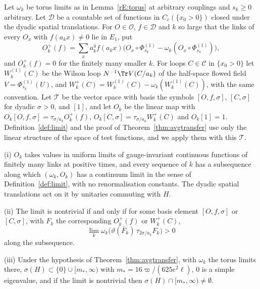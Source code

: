 \begin{theorem}\label{rF13:half}
Let $\omega_k$ be torus limits as in Lemma~\textup{\ref{rE:torus}} at
arbitrary couplings and $s_k\ge0$ arbitrary. Let $\mathcal D$ be a countable
set of functions in $C_c(\{x_0>0\})$ closed under the dyadic spatial
translations. For $O\in\mathcal O$, $f\in\mathcal D$ and $k$ so large that the
links of every $O_x$ with $f(a_kx)\ne0$ lie in $E_1$, put
\[
O^+_k(f)=\sum_xa_k^4f(a_kx)\bigl(O_x\circ\Phi^{(1)}_{s_k}-\omega_k(O_x\circ
\Phi^{(1)}_{s_k})\bigr),
\]
and $O^+_k(f)=0$ for the finitely many smaller $k$. For loops $C\in\mathcal
C$ in $\{x_0>0\}$ let $W^{(1)}_k(C)$ be the Wilson loop $N^{-1}\Tr V(C/a_k)$
of the half-space flowed field $V=\Phi^{(1)}_{s_k}(U)$, and
$W^+_k(C)=W^{(1)}_k(C)-\omega_k(W^{(1)}_k(C))$, with the same convention.
Let $\mathcal T$ be the vector space with basis the symbols $[O,f,\sigma]$,
$[C,\sigma]$ for dyadic $\sigma>0$, and $[1]$, and let $O_k$ be the linear
map with $O_k[O,f,\sigma]=\tau_{\sigma/a_k}O^+_k(f)$,
$O_k[C,\sigma]=\tau_{\sigma/a_k}W^+_k(C)$ and $O_k[1]=1$.
Definition~\ref{def:limit} and the proof of Theorem~\ref{thm:avgtransfer}
use only the linear structure of the space of test functions, and we apply
them with this $\mathcal T$.

\textup{(i)} $O_k$ takes values in uniform limits of gauge-invariant
continuous functions of finitely many links at positive times, and every
sequence of $k$ has a subsequence along which $(\omega_k,O_k)$ has a
continuum limit in the sense of Definition~\textup{\ref{def:limit}}, with no
renormalisation constants. The dyadic spatial translations act on it by
unitaries commuting with $H$.

\textup{(ii)} The limit is nontrivial if and only if for some basis
element $[O,f,\sigma]$ or $[C,\sigma]$, with $F_k$ the corresponding
$O^+_k(f)$ or $W^+_k(C)$,
\[
\lim_k\omega_k\bigl(\vartheta(\bar F_k)\,\tau_{2\sigma/a_k}F_k\bigr)>0
\]
along the subsequence.

\textup{(iii)} Under the hypothesis of Theorem~\textup{\ref{thm:avgtransfer}},
with $\omega_k$ the torus limits there,
$\sigma(H)\subset\{0\}\cup[m_*,\infty)$ with $m_*=16\varpi/(625e^2\ell)$,
$0$ is a simple eigenvalue, and if the limit is nontrivial then
$\sigma(H)\cap[m_*,\infty)\ne\emptyset$.
\end{theorem}

